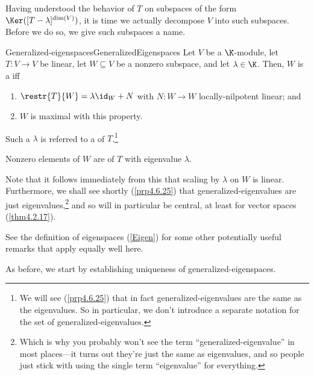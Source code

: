 Having understood the behavior of $T$ on subspaces of the form $\Ker ([T-\lambda ]^{\dim (V)})$, it is time we actually decompose $V$ into such subspaces.  Before we do so, we give such subspaces a name.
\begin{dfn}{Generalized-eigenspaces}{GeneralizedEigenspaces}
	Let $V$ be a $\K$-module, let $T\colon V\rightarrow V$ be linear, let $W\subseteq V$ be a nonzero subspace, and let $\lambda \in \K$.  Then, $W$ is a  iff
	\begin{enumerate}
		\item $\restr{T}{W}=\lambda \id _W+N$ with $N\colon W\rightarrow W$ locally-nilpotent linear; and
		\item $W$ is maximal with this property.
	\end{enumerate}
	\begin{rmk}
		Such a $\lambda$ is referred to a  of $T$.\footnote{We will see (\cref{prp4.6.25}) that in fact generalized-eigenvalues are the same as the eigenvalues.  So in particular, we don't introduce a separate notation for the set of generalized-eigenvalues.}
	\end{rmk}
	\begin{rmk}
		Nonzero elements of $W$ are  of $T$ with eigenvalue $\lambda$.
	\end{rmk}
	\begin{rmk}
		Note that it follows immediately from this that scaling by $\lambda$ on $W$ is linear.  Furthermore, we shall see shortly (\cref{prp4.6.25}) that generalized-eigenvalues are just eigenvalues,\footnote{Which is why you probably won't see the term ``generalized-eigenvalue'' in most places---it turns out they're just the same as eigenvalues, and so people just stick with using the single term ``eigenvalue'' for everything.} and so will in particular be central, at least for vector spaces (\cref{thm4.2.17}).
	\end{rmk}
	\begin{rmk}
		See the definition of eigenspaces (\cref{Eigen}) for some other potentially useful remarks that apply equally well here.
	\end{rmk}
\end{dfn}
As before, we start by establishing uniqueness of generalized-eigenspaces.

